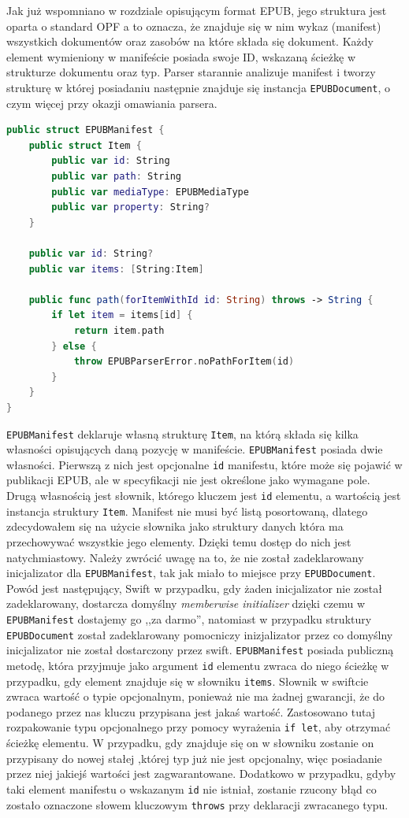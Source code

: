 Jak już wspomniano w rozdziale opisującym format EPUB, jego struktura jest oparta o standard OPF a to oznacza, że znajduje się w nim wykaz (manifest) wszystkich dokumentów oraz zasobów na które składa się dokument. Każdy element wymieniony w manifeście posiada swoje ID, wskazaną ścieżkę w strukturze dokumentu oraz typ. Parser starannie analizuje manifest i tworzy strukturę w której posiadaniu następnie znajduje się instancja \texttt{EPUBDocument}, o czym więcej przy okazji omawiania parsera.

\begin{lstlisting}[caption={Struktura EPUBManifest}, language=swift,label=fghjk]
public struct EPUBManifest {
    public struct Item {
        public var id: String
        public var path: String
        public var mediaType: EPUBMediaType
        public var property: String?
    }

    public var id: String?
    public var items: [String:Item]

    public func path(forItemWithId id: String) throws -> String {
        if let item = items[id] {
            return item.path
        } else {
            throw EPUBParserError.noPathForItem(id)
        }
    }
}
\end{lstlisting}

\texttt{EPUBManifest} deklaruje własną strukturę \texttt{Item}, na którą składa się kilka własności opisujących daną pozycję w manifeście. \texttt{EPUBManifest} posiada dwie własności. Pierwszą z nich jest opcjonalne \texttt{id} manifestu, które może się pojawić w publikacji EPUB, ale w specyfikacji nie jest określone jako wymagane pole. Drugą własnością jest słownik, którego kluczem jest \texttt{id} elementu, a wartością jest instancja struktury \texttt{Item}. Manifest nie musi być listą posortowaną, dlatego zdecydowałem się na użycie słownika jako struktury danych która ma przechowywać wszystkie jego elementy. Dzięki temu dostęp do nich jest natychmiastowy. Należy zwrócić uwagę na to, że nie został zadeklarowany inicjalizator dla \texttt{EPUBManifest}, tak jak miało to miejsce przy \texttt{EPUBDocument}. Powód jest następujący, Swift w przypadku, gdy żaden inicjalizator nie został zadeklarowany, dostarcza domyślny \textit{memberwise initializer} dzięki czemu w \texttt{EPUBManifest} dostajemy go ,,za darmo'', natomiast w przypadku struktury \texttt{EPUBDocument} został zadeklarowany pomocniczy inizjalizator przez co domyślny inicjalizator nie został dostarczony przez swift. \texttt{EPUBManifest} posiada publiczną metodę, która przyjmuje jako argument \texttt{id} elementu zwraca do niego ścieżkę w przypadku, gdy element znajduje się w słowniku \texttt{items}. Słownik w swiftcie zwraca wartość o typie opcjonalnym, ponieważ nie ma żadnej gwarancji, że do podanego przez nas kluczu przypisana jest jakaś wartość. Zastosowano tutaj rozpakowanie typu opcjonalnego przy pomocy wyrażenia \texttt{if let}, aby otrzymać ścieżkę elementu. W przypadku, gdy znajduje się on w słowniku zostanie on przypisany do nowej stałej ,której typ już nie jest opcjonalny, więc posiadanie przez niej jakiejś wartości jest zagwarantowane. Dodatkowo w przypadku, gdyby taki element manifestu o wskazanym \texttt{id} nie istniał, zostanie rzucony błąd co zostało oznaczone słowem kluczowym \texttt{throws} przy deklaracji zwracanego typu.

